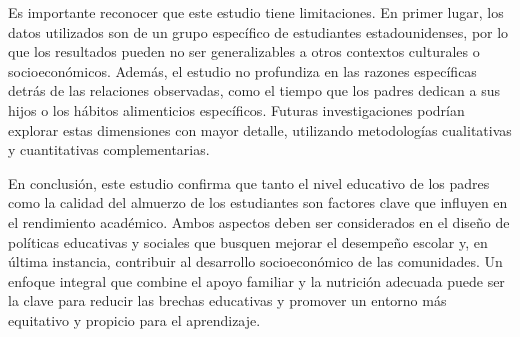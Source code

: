 \documentclass[
]{article}
\begin{document}
Es importante reconocer que este estudio tiene limitaciones. En primer
lugar, los datos utilizados son de un grupo específico de estudiantes
estadounidenses, por lo que los resultados pueden no ser generalizables
a otros contextos culturales o socioeconómicos. Además, el estudio no
profundiza en las razones específicas detrás de las relaciones
observadas, como el tiempo que los padres dedican a sus hijos o los
hábitos alimenticios específicos. Futuras investigaciones podrían
explorar estas dimensiones con mayor detalle, utilizando metodologías
cualitativas y cuantitativas complementarias.

En conclusión, este estudio confirma que tanto el nivel educativo de los
padres como la calidad del almuerzo de los estudiantes son factores
clave que influyen en el rendimiento académico. Ambos aspectos deben ser
considerados en el diseño de políticas educativas y sociales que busquen
mejorar el desempeño escolar y, en última instancia, contribuir al
desarrollo socioeconómico de las comunidades. Un enfoque integral que
combine el apoyo familiar y la nutrición adecuada puede ser la clave
para reducir las brechas educativas y promover un entorno más equitativo
y propicio para el aprendizaje.
\end{document}
